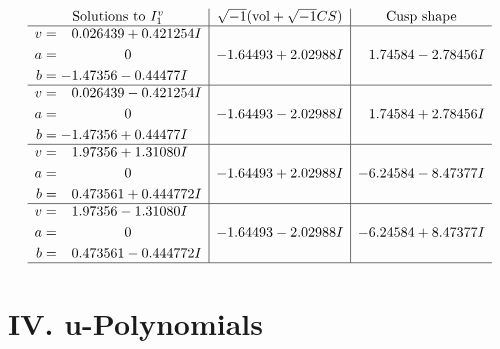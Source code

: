 \documentclass[1p]{elsarticle_modified}
\theoremstyle{definition}
\newcommand{\I}{\sqrt{-1}}
\begin{document}
$$\begin{array}{c|c|c}  
\text{Solutions to }I^v_{1}& \I (\text{vol} + \sqrt{-1}CS) & \text{Cusp shape}\\
 \hline 
\begin{aligned}
v &= \phantom{-}0.026439 + 0.421254 I \\
a &= \phantom{-0.000000 } 0 \\
b &= -1.47356 - 0.44477 I\end{aligned}
 & -1.64493 + 2.02988 I & \phantom{-}1.74584 - 2.78456 I \\ \hline\begin{aligned}
v &= \phantom{-}0.026439 - 0.421254 I \\
a &= \phantom{-0.000000 } 0 \\
b &= -1.47356 + 0.44477 I\end{aligned}
 & -1.64493 - 2.02988 I & \phantom{-}1.74584 + 2.78456 I \\ \hline\begin{aligned}
v &= \phantom{-}1.97356 + 1.31080 I \\
a &= \phantom{-0.000000 } 0 \\
b &= \phantom{-}0.473561 + 0.444772 I\end{aligned}
 & -1.64493 + 2.02988 I & -6.24584 - 8.47377 I \\ \hline\begin{aligned}
v &= \phantom{-}1.97356 - 1.31080 I \\
a &= \phantom{-0.000000 } 0 \\
b &= \phantom{-}0.473561 - 0.444772 I\end{aligned}
 & -1.64493 - 2.02988 I & -6.24584 + 8.47377 I\\
 \hline 
 \end{array}$$\newpage
\newpage\renewcommand{\arraystretch}{1}
\centering \section*{ IV. u-Polynomials}
\end{document}
